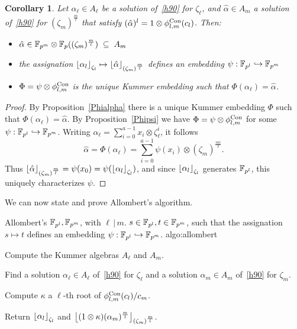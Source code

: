 \documentclass{sig-alternate}
\newtheorem{corollary}[theorem]{Corollary}
\begin{document}
\begin{corollary}
\label{alphapsi}
Let $\alpha_\ell\in A_\ell$ be a solution of~\eqref{h90} for $\zeta_\ell$,
and $\hat{\alpha}\in A_m$ a solution of~\eqref{h90} for $(\zeta_m)^{\frac{m}{\ell}}$
that satisfy $(\hat{\alpha})^l=1\otimes{\phi^{\textrm{Con}}_{{l},{m}}}(c_l)$.
Then:
\begin{itemize}
\item $\hat{\alpha}\in\mathbb{F}_{p^m}\otimes\mathbb{F}_{p}((\zeta_m)^{\frac{m}{l}})\;\subseteq\;A_m$
\item the assignation $\left\lfloor \alpha_{l} \right\rfloor_{\zeta_l}\mapsto\left\lfloor \hat{\alpha} \right\rfloor_{(\zeta_m)^{\frac{m}{l}}}$
defines an embedding $\psi:\mathbb{F}_{p^l}\hookrightarrow\mathbb{F}_{p^m}$
\item $\Phi=\psi\otimes{\phi^{\textrm{Con}}_{{l},{m}}}$ is the unique Kummer embedding such that $\Phi(\alpha_\ell)=\hat{\alpha}$.
\end{itemize}
\end{corollary}
\begin{proof}
By Proposition~\ref{Phialpha} there is a unique Kummer embedding $\Phi$ such that $\Phi(\alpha_\ell)=\hat{\alpha}$.
By Proposition~\ref{Phipsi} we have $\Phi=\psi\otimes{\phi^{\textrm{Con}}_{{l},{m}}}$ for some $\psi:\mathbb{F}_{p^l}\hookrightarrow\mathbb{F}_{p^m}$.
Writing $\alpha_\ell=\sum_{i=0}^{a-1}x_i\otimes\zeta_{\ell}^i$,
it follows \[ \hat{\alpha}=\Phi(\alpha_\ell)=\sum_{i=0}^{a-1}\psi(x_i)\otimes(\zeta_m)^{\frac{mi}{\ell}}. \]
Thus $\left\lfloor \hat{\alpha} \right\rfloor_{(\zeta_m)^{\frac{m}{l}}}=\psi(x_0)=\psi(\left\lfloor \alpha_{l} \right\rfloor_{\zeta_l})$,
and since $\left\lfloor \alpha_{l} \right\rfloor_{\zeta_l}$ generates $\mathbb{F}_{p^l}$, this uniquely characterizes $\psi$.
\end{proof}

We can now state and prove Allombert's algorithm.

\begin{algorithm_endline}
  {Allombert's}
  {$\mathbb{F}_{p^l}, \mathbb{F}_{p^m}$, with $\ell\,|\,m$.}
  {$s\in\mathbb{F}_{p^l}, t\in\mathbb{F}_{p^m}$, such that the assignation $s\mapsto t$
  defines an embedding $\psi:\mathbb{F}_{p^l}\hookrightarrow\mathbb{F}_{p^m}$.}
  {algo:allombert}
\item Compute the Kummer algebras $A_\ell$ and $A_m$.
\item Find a solution $\alpha_\ell\in A_\ell$ of~\eqref{h90} for $\zeta_\ell$
  and a solution $\alpha_m\in A_m$ of~\eqref{h90} for $\zeta_m$.
\item Compute $\kappa$ a $\ell$-th root of ${\phi^{\textrm{Con}}_{{l},{m}}}(c_l)/c_m$.
\item Return $\left\lfloor \alpha_{l} \right\rfloor_{\zeta_l}$ and $\left\lfloor (1\otimes\kappa)(\alpha_m)^{\frac{m}{l}} \right\rfloor_{(\zeta_m)^{\frac{m}{l}}}$.
\vspace{.5\baselineskip}
\end{algorithm_endline}
\end{document}
